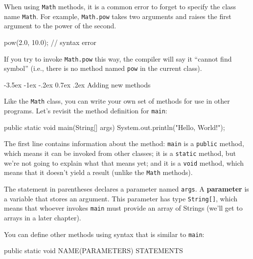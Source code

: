 \documentclass[12pt]{book}
\makeatletter
\renewcommand{\section}{\@startsection {section}{1}{\z@}%
    {-3.5ex \@plus -1ex \@minus -.2ex}%
    {0.7ex \@plus.2ex}%
    {\normalfont\Large\bfseries}}
\theoremstyle{exercise}
\newcommand{\java}[1]{\lstinline{#1}} %
\makeatother
\begin{document}
When using \java{Math} methods, it is a common error to forget to specify the class name \java{Math}.
For example, \java{Math.pow} takes two arguments and raises the first argument to the power of the second.

\begin{code}
    pow(2.0, 10.0);  // syntax error
\end{code}

If you try to invoke \java{Math.pow} this way, the compiler will say it ``cannot find symbol'' (i.e., there is no method named \java{pow} in the current class).


\section{Adding new methods}
\label{adding_methods}


Like the \java{Math} class, you can write your own set of methods for use in other programs.
Let's revisit the method definition for \java{main}:

\begin{code}
    public static void main(String[] args) {
        System.out.println("Hello, World!");
    }
\end{code}


The first line contains information about the method:
\java{main} is a \java{public} method, which means it can be invoked from other classes;
it is a \java{static} method, but we're not going to explain what that means yet;
and it is a \java{void} method, which means that it doesn't yield a result (unlike the \java{Math} methods).


The statement in parentheses declares a parameter named
\java{args}.  A {\bf parameter} is a variable that stores an argument.
This parameter has type \java{String[]}, which means that whoever invokes \java{main} must provide an array of Strings (we'll get to arrays in a later chapter).

You can define other methods using syntax that is similar to \java{main}:

\begin{code}
    public static void NAME(PARAMETERS) {
        STATEMENTS
    }
\end{code}
\end{document}
